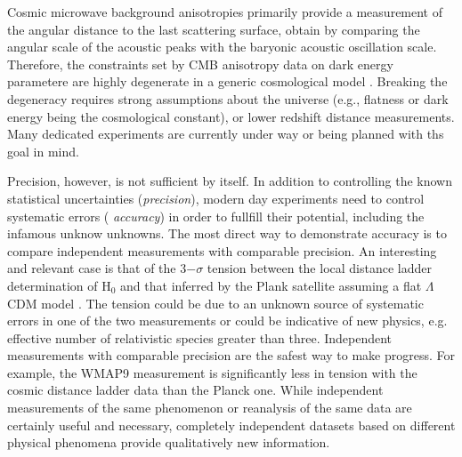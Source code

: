 Cosmic microwave background anisotropies primarily provide a
measurement of the angular distance to the last scattering surface,
obtain by comparing the angular scale of the acoustic peaks with the
baryonic acoustic oscillation scale. Therefore, the constraints set by
CMB anisotropy data on dark energy parametere are highly degenerate in
a generic cosmological model
\citep[e.g.,][]{Pla15}. Breaking the degeneracy requires strong
assumptions about the universe (e.g., flatness or dark energy being the
cosmological constant), or lower redshift distance measurements. Many
dedicated experiments are currently under way or being planned with
ths goal in mind.



Precision, however, is not sufficient by itself. In addition to
controlling the known statistical uncertainties ({\it precision}),
modern day experiments need to control systematic errors ({\it
accuracy}) in order to fullfill their potential, including the
infamous unknow unknowns. The most direct way to demonstrate accuracy
is to compare independent measurements with comparable precision. An
interesting and relevant case is that of the 3$-\sigma$ tension
between the local distance ladder determination of H$_0$
\citep{Rie++16} and that inferred by the Plank satellite assuming a
flat $\Lambda$CDM model \citep{Pla15}. The tension could be due to an
unknown source of systematic errors in one of the two measurements or
could be indicative of new physics, e.g. effective number of
relativistic species greater than three. Independent measurements with
comparable precision are the safest way to make progress. For example,
the WMAP9 measurement \citep{Cal++13} is significantly less in tension
with the cosmic distance ladder data than the Planck one. While
independent measurements of the same phenomenon or reanalysis of the
same data \citep{Efs14,SFH15} are certainly useful and necessary,
completely independent datasets based on different physical phenomena
provide qualitatively new information.

